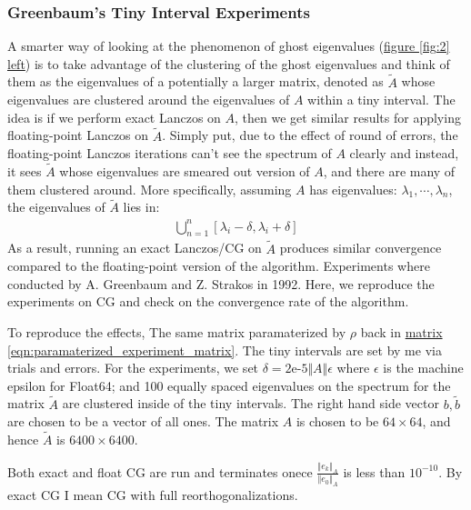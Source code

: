 \documentclass[]{article}
\theoremstyle{definition}
\begin{document}
    \subsubsection{Greenbaum's Tiny Interval Experiments}
        A smarter way of looking at the phenomenon of ghost eigenvalues (\hyperref[fig:2]{figure \ref*{fig:2} left}) is to take advantage of the clustering of the ghost eigenvalues and think of them as the eigenvalues of a potentially a larger matrix, denoted as $\tilde{A}$ whose eigenvalues are clustered around the eigenvalues of $A$ within a tiny interval. The idea is if we perform exact Lanczos on $A$, then we get similar results for applying floating-point Lanczos on $\tilde{A}$. Simply put, due to the effect of round of errors, the floating-point Lanczos iterations can't see the spectrum of $A$ clearly and instead, it sees $\tilde{A}$ whose eigenvalues are smeared out version of $A$, and there are many of them clustered around. More specifically, assuming $A$ has eigenvalues: $\lambda_1, \cdots, \lambda_n$, the eigenvalues of $\tilde{A}$ lies in: 
        \begin{align}
            \bigcup_{n = 1}^n[\lambda_i - \delta, \lambda_i + \delta]
        \end{align}
        As a result, running an exact Lanczos/CG on $\tilde{A}$ produces similar convergence compared to the floating-point version of the algorithm. Experiments where conducted by A. Greenbaum and Z. Strakos in 1992\cite{paper:greenbaum_tiny_interval_experiments}. Here, we reproduce the experiments on CG and check on the convergence rate of the algorithm. 
        \par
        To reproduce the effects, The same matrix paramaterized by $\rho$ back in \hyperref[eqn:paramaterized_experiment_matrix]{matrix \ref*{eqn:paramaterized_experiment_matrix}}. The tiny intervals are set by me via trials and errors. For the experiments, we set $\delta = \text{2e-5}\Vert A\Vert \epsilon$ where $\epsilon$ is the machine epsilon for Float64; and 100 equally spaced eigenvalues on the spectrum for the matrix $\tilde A$ are clustered inside of the tiny intervals. The right hand side vector $b,\tilde b$ are chosen to be a vector of all ones. The matrix $A$ is chosen to be $64 \times 64$, and hence $\tilde A$ is $6400 \times 6400$. 
        \par
        Both exact and float CG are run and terminates onece $\frac{\Vert e_k\Vert_A}{\Vert e_0\Vert_A}$ is less than $10^{-10}$. By exact CG I mean CG with full reorthogonalizations. 
\end{document}
